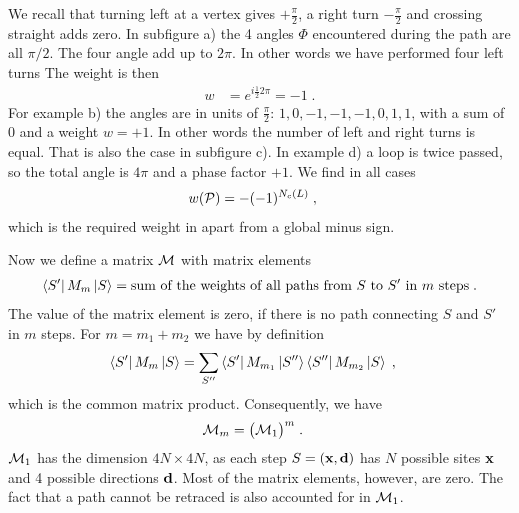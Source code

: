 We recall that turning left at a vertex gives $+\tfrac{\pi}{2}$, a right turn $-\tfrac{\pi}{2}$
and crossing straight adds zero.
In subfigure a)
the 4 angles $\Phi$ encountered during the path are all $\pi/2$. The four angle add up to $2 \pi$.
In other words we have performed four left turns
The weight is then
%
\begin{align*}
w &=e^{i \tfrac{1}{2} 2\pi} = -1\;.
\end{align*}
% 
For example b) the angles are in units of $\tfrac{\pi}{2}$: $1,0,-1,-1,-1,0,1,1$, with a sum of $0$ and a weight $w=+1$. In other words the number of left and right turns is equal. That is also the case in subfigure c). In example d) a loop is twice passed, so the total angle is $4 \pi$ and a phase factor $+1$.
We find in all  cases
%
\begin{align*}
w({\cal P}) &= - (-1)^{N_{c}(L)}\;,
\end{align*}
%
which is the required weight in  apart from a global minus sign.

Now we define a matrix ${\cal M}$ with matrix elements
%
\begin{align*}
\bra{S'} M_{m}\ket{S} = \text{sum of the weights of all paths from $S$  to $S'$  in $m$ steps}\;.
\end{align*}
%
The value of the matrix element is zero, if there is no path connecting $S$ and $S'$
in $m$ steps.
For $m=m_{1}+m_{2}$  we have  by definition
%
\begin{align*}
\bra{S'} M_{m}\ket{S}  &=
\sum_{S''}\bra{S'} M_{m_{1}}\ket{S''} \bra{S''} M_{m_{2}}\ket{S}   \;,
\end{align*}
%
which is the common matrix product. Consequently, we have
%
\begin{align*}
{\cal M} _{m}  &= \big({\cal M}_{1}\big)^{m}\;.
\end{align*}
%
${\cal M}_{1}$ has the dimension $4 N\times 4N$, as each step $S=(\mathbf x,\mathbf d)$ has
$N$ possible sites $\mathbf x$ and 4 possible directions $\mathbf d$. Most of the matrix elements, however, are zero. The fact that a path cannot be retraced is also accounted for in ${\cal M}_{1}$.


